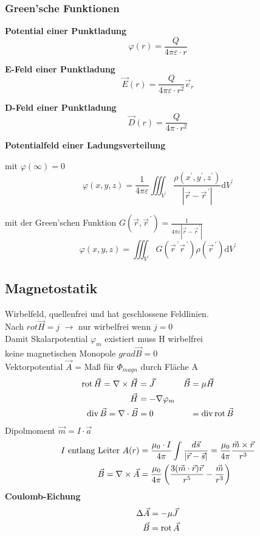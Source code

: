 \subsubsection{Green'sche Funktionen}
\textbf{Potential einer Punktladung}
\[ \varphi (r) = \dfrac{Q}{4 \pi \varepsilon \cdot r} \]

\textbf{E-Feld einer Punktladung}
\[ \vec{E}(r) = \dfrac{Q}{4 \pi \varepsilon \cdot r^2} \vec{e}_r \]

\textbf{D-Feld einer Punktladung}
\[ \vec{D}(r) = \dfrac{Q}{4 \pi \cdot r^2} \]

\textbf{Potentialfeld einer Ladungsverteilung}

mit $\varphi(\infty)=0$
\[
    \varphi(x, y, z)=\frac{1}{4 \pi \varepsilon} \iiint_{V^{\prime}}
    \frac{\rho\left(x^{\prime}, y^{\prime},
        z^{\prime}\right)}{\left|\vec{r}-\vec{r}^{\,\prime}\right|} \mathrm{d}
    V^{\prime}
\]

mit der Green'schen Funktion $G\left(\vec{r}, \vec{r}^{\,\prime}\right)=\frac{1}{4 \pi \varepsilon\left|\vec{r}-\vec{r}^{\,\prime}\right|}$
\[\varphi(x, y, z)=\iiint_{V^{\prime}} G\left(\vec{r}^{\,\prime} \vec{r}^{\,\prime}\right) \rho\left(\vec{r}^{\,\prime}\right) \mathrm{d} V^{\prime}\]


\subsection{Magnetostatik}
\textbullet Wirbelfeld, quellenfrei und hat geschlossene Feldlinien.\\
\textbullet Nach $rot \vec{H} = j$ $\rightarrow$ nur wirbelfrei wenn $j = 0$\\
\textbullet Damit Skalarpotential $ \varphi_m$ existiert muss H wirbelfrei\\
\textbullet keine magnetischen Monopole $grad \vec{B} = 0$\\
\textbullet Vektorpotential $ \vec{A}$ = Maß für $\Phi_{magn} $ durch Fläche A
\begin{align*}
    \operatorname{rot} \vec{H} = \nabla \times \vec{H} & = \vec{J}            & \vec{B} & = \mu \vec{H}           \\
    \vec{H}                                & = - \nabla \varphi_m &                                   \\
    \operatorname{div} \vec{B} = \nabla \cdot \vec{B}  & = 0                  &         & = \operatorname{div} \operatorname{rot} \vec{B}
\end{align*}
Dipolmoment $ \vec{m} = I \cdot \vec{a}$
\begin{align*}
    I\textnormal{ entlang Leiter } A(r) & = \frac{\mu_0 \cdot I}{4 \pi} \int \frac{d \vec{s}}{| \vec{r} - \vec{s}|} = \frac{ \mu_0}{4 \pi} \frac{\vec{m} \times \vec{r}}{r^3} \\
    \vec{B} = \nabla \times \vec{A}       & = \frac{\mu_0}{4 \pi} \left(\frac{3(\vec{m} \cdot \vec{r})\vec{r}}{r^5} - \frac{\vec{m}}{r^3}\right)
\end{align*}
\textbf{Coulomb-Eichung}
\begin{align*}
    \Delta \vec{A} & = - \mu \vec{J}  \\
    \vec{B}        & = \operatorname{rot} \vec{A}
\end{align*}

